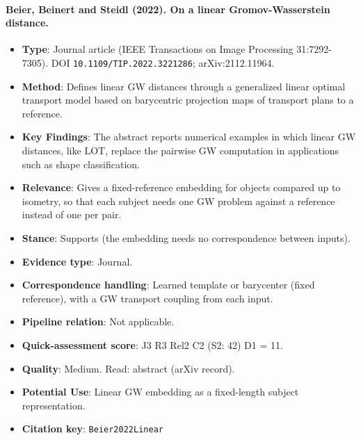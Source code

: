 \documentclass[journal,onecolumn]{IEEEtran}
\begin{document}
\paragraph{Beier, Beinert and Steidl (2022). On a linear Gromov-Wasserstein distance.~\cite{Beier2022Linear}}\mbox{}

\begin{itemize}

\item{} \textbf{Type}: Journal article (IEEE Transactions on Image Processing 31:7292-7305). DOI \nolinkurl{10.1109/TIP.2022.3221286}; arXiv:2112.11964.

\item{} \textbf{Method}: Defines linear GW distances through a generalized linear optimal transport model based on barycentric projection maps of transport plans to a reference.

\item{} \textbf{Key Findings}: The abstract reports numerical examples in which linear GW distances, like LOT, replace the pairwise GW computation in applications such as shape classification.

\item{} \textbf{Relevance}: Gives a fixed-reference embedding for objects compared up to isometry, so that each subject needs one GW problem against a reference instead of one per pair.

\item{} \textbf{Stance}: Supports (the embedding needs no correspondence between inputs).

\item{} \textbf{Evidence type}: Journal.

\item{} \textbf{Correspondence handling}: Learned template or barycenter (fixed reference), with a GW transport coupling from each input.

\item{} \textbf{Pipeline relation}: Not applicable.

\item{} \textbf{Quick-assessment score}: J3 R3 Rel2 C2 (S2: 42) D1 = 11.

\item{} \textbf{Quality}: Medium. Read: abstract (arXiv record).

\item{} \textbf{Potential Use}: Linear GW embedding as a fixed-length subject representation.

\item{} \textbf{Citation key}: \texttt{Beier2022Linear}

\end{itemize}
\end{document}
